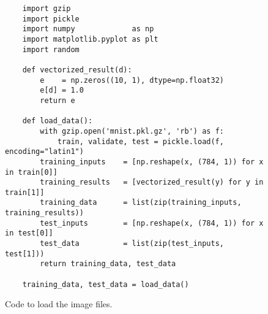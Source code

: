 \begin{figure}[!ht]
\centering
\begin{verbatim}
    import gzip
    import pickle
    import numpy             as np
    import matplotlib.pyplot as plt
    import random

    def vectorized_result(d):
        e    = np.zeros((10, 1), dtype=np.float32)
        e[d] = 1.0
        return e

    def load_data():
        with gzip.open('mnist.pkl.gz', 'rb') as f:
            train, validate, test = pickle.load(f, encoding="latin1")
        training_inputs    = [np.reshape(x, (784, 1)) for x in train[0]]
        training_results   = [vectorized_result(y) for y in train[1]]
        training_data      = list(zip(training_inputs, training_results))
        test_inputs        = [np.reshape(x, (784, 1)) for x in test[0]]
        test_data          = list(zip(test_inputs, test[1]))
        return training_data, test_data
    
    training_data, test_data = load_data()
\end{verbatim}
\vspace*{-0.3cm}
\caption{Code to load the image files.}
\label{fig:Digit-Regocnition.ipynb-1}
\end{figure}

